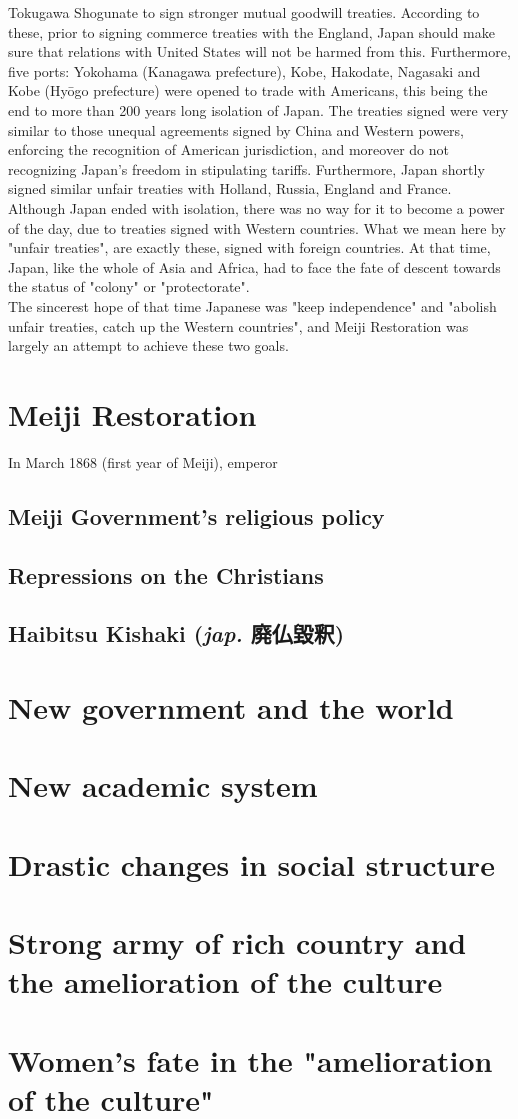 \documentclass[11pt]{book}
\begin{document}
Tokugawa Shogunate to sign stronger mutual goodwill treaties. According to these, prior to signing commerce treaties with the England,
Japan should make sure that relations with United States will not be harmed from this. Furthermore, five ports: Yokohama (Kanagawa prefecture),
Kobe, Hakodate, Nagasaki and Kobe (Hy\=ogo prefecture) were opened to trade with Americans, this being the end to more than 200 years long isolation
of Japan. The treaties signed were very similar to those unequal agreements signed by China and Western powers, enforcing the recognition
of American jurisdiction, and moreover do not recognizing Japan's freedom in stipulating tariffs. Furthermore, Japan shortly signed similar
unfair treaties with Holland, Russia, England and France.\\
Although Japan ended with isolation, there was no way for it to become a power of the day, due to treaties signed with Western countries. What
we mean here
by "unfair treaties", are exactly these, signed with foreign countries. At that time, Japan, like the whole of Asia and Africa, had to face
the fate of descent towards the status of "colony" or "protectorate".\\
The sincerest hope of that time Japanese was "keep independence" and "abolish unfair treaties, catch up the Western countries", and Meiji
Restoration was largely an attempt to achieve these two goals.
\section{Meiji Restoration}%
In March 1868 (first year of Meiji), emperor
\begin{CJK}{UTF8}{bsmi}
\section{Meiji Government's religious policy}%
\subsection{Repressions on the Christians}
\subsection{Haibitsu Kishaki (\textit{jap.} 廃仏毀釈)}
\end{CJK}
\section{New government and the world}

\section{New academic system}%
\section{Drastic changes in social structure}%
\section{Strong army of rich country and the amelioration of the culture}%
\section{Women's fate in the "amelioration of the culture"}%
\end{document}
